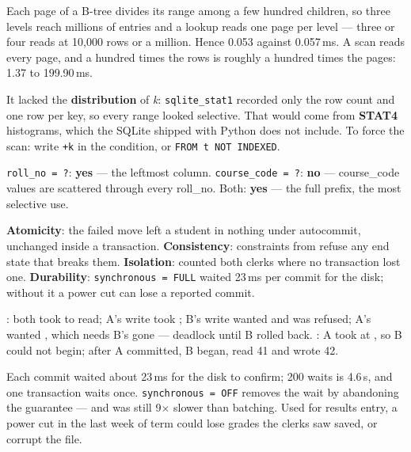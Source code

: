 \begin{ans}
  \item Each page of a B-tree divides its range among a few hundred children,
        so three levels reach millions of entries and a lookup reads one page
        per level --- three or four reads at 10{,}000 rows or a million.
        Hence 0.053 against 0.057\,ms. A scan reads every page, and a hundred
        times the rows is roughly a hundred times the pages: 1.37 to
        199.90\,ms.
  \item It lacked the \textbf{distribution} of \textit{k}: \texttt{sqlite\_stat1}
        recorded only the row count and one row per key, so every range looked
        selective. That would come from \textbf{STAT4} histograms, which the
        SQLite shipped with Python does not include. To force the scan: write
        \texttt{+k} in the condition, or \texttt{FROM t NOT INDEXED}.
  \item \texttt{roll\_no = ?}: \textbf{yes} --- the leftmost column.
        \texttt{course\_code = ?}: \textbf{no} --- course\_code values are
        scattered through every roll\_no. Both: \textbf{yes} --- the full
        prefix, the most selective use.
\end{ans}

\begin{ans}
  \item \textbf{Atomicity}: the failed move left a student in nothing under
        autocommit, unchanged inside a transaction. \textbf{Consistency}:
        constraints from  refuse any end state that breaks
        them. \textbf{Isolation}:  counted both clerks where
        no transaction lost one. \textbf{Durability}: \texttt{synchronous =
        FULL} waited 23\,ms per commit for the disk; without it a power cut can
        lose a reported commit.
  \item {}: both took  to read; A's write took
        ; B's write wanted  and was refused;
        A's  wanted , which needs B's
         gone --- deadlock until B rolled back.
        : A took  at , so B
        could not begin; after A committed, B began, read 41 and wrote 42.
  \item Each commit waited about 23\,ms for the disk to confirm; 200 waits is
        4.6\,s, and one transaction waits once. \texttt{synchronous = OFF}
        removes the wait by abandoning the guarantee --- and was still
        9$\times$ slower than batching. Used for results entry, a power cut in
        the last week of term could lose grades the clerks saw saved, or
        corrupt the file.
\end{ans}

